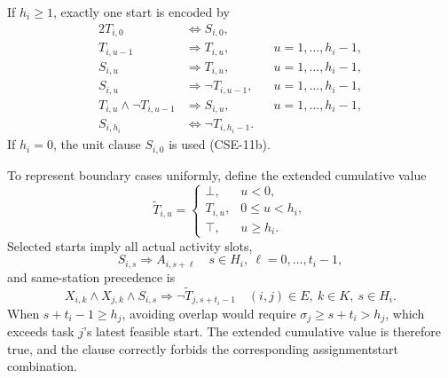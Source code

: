 \documentclass[]{interact}
\theoremstyle{plain}
\theoremstyle{definition}
\theoremstyle{remark}
\begin{document}
If $h_i\geq1$, exactly one start is encoded by
\begin{alignat}{2}
T_{i,0}&\Leftrightarrow S_{i,0}, && \tag{CSE-7}\\
T_{i,u-1}&\Rightarrow T_{i,u}, && u=1,\ldots,h_i-1, \tag{CSE-8}\\
S_{i,u}&\Rightarrow T_{i,u}, && u=1,\ldots,h_i-1, \tag{CSE-9}\\
S_{i,u}&\Rightarrow\neg T_{i,u-1}, && u=1,\ldots,h_i-1, \tag{CSE-10}\\
T_{i,u}\wedge\neg T_{i,u-1}&\Rightarrow S_{i,u}, && u=1,\ldots,h_i-1, \tag{CSE-11}\\
S_{i,h_i}&\Leftrightarrow\neg T_{i,h_i-1}. && \tag{CSE-11a}
\end{alignat}
If $h_i=0$, the unit clause $S_{i,0}$ is used (CSE-11b).

To represent boundary cases uniformly, define the extended cumulative value
\begin{equation}
\widetilde T_{i,u}=\begin{cases}
\bot,&u<0,\\
T_{i,u},&0\leq u<h_i,\\
\top,&u\geq h_i.
\end{cases}
\label{eq:extended-t}
\end{equation}
Selected starts imply all actual activity slots,
\begin{equation}
S_{i,s}\Rightarrow A_{i,s+\ell}
\quad s\in H_i,\ \ell=0,\ldots,t_i-1,
\tag{CSE-12}
\label{eq:cse12}
\end{equation}
and same-station precedence is
\begin{equation}
X_{i,k}\wedge X_{j,k}\wedge S_{i,s}
\Rightarrow\neg\widetilde T_{j,s+t_i-1}
\quad (i,j)\in E,\ k\in K,\ s\in H_i.
\tag{CSE-13}
\label{eq:cse13}
\end{equation}
When $s+t_i-1\geq h_j$, avoiding overlap would require $\sigma_j\geq s+t_i>h_j$, which exceeds task $j$'s latest feasible start. The extended cumulative value is therefore true, and the clause correctly forbids the corresponding assignment\textendash{}start combination.
\end{document}
